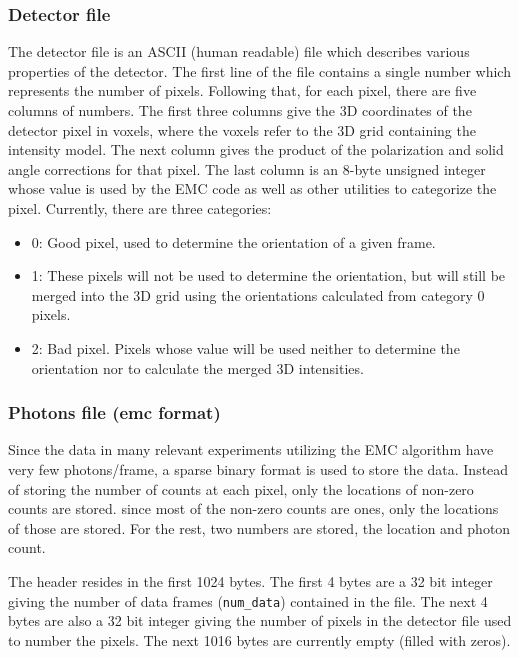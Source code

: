 \documentclass[]{iucr}              %
\begin{document}
\subsubsection{Detector file}\label{subsubsec:detector}
The detector file is an ASCII (human readable) file which describes various properties of the detector. The first line of the file contains a single number which represents the number of pixels. Following that, for each pixel, there are five columns of numbers. The first three columns give the 3D coordinates of the detector pixel in voxels, where the voxels refer to the 3D grid containing the intensity model. The next column gives the product of the polarization and solid angle corrections for that pixel. The last column is an 8-byte unsigned integer whose value is used by the EMC code as well as other utilities to categorize the pixel. Currently, there are three categories:
\begin{itemize}
\item 0: Good pixel, used to determine the orientation of a given frame.
\item 1: These pixels will not be used to determine the orientation, but will still be merged into the 3D grid using the orientations calculated from category 0 pixels.
\item 2: Bad pixel. Pixels whose value will be used neither to determine the orientation nor to calculate the merged 3D intensities.
\end{itemize}

\subsubsection{Photons file (emc format)}\label{subsubsec:emcformat}
Since the data in many relevant experiments utilizing the EMC algorithm have very few photons/frame, a sparse binary format is used to store the data. Instead of storing the number of counts at each pixel, only the locations of non-zero counts are stored. since most of the non-zero counts are ones, only the locations of those are stored. For the rest, two numbers are stored, the location and photon count. 

The header resides in the first 1024 bytes. The first 4 bytes are a 32 bit integer giving the number of data frames (\texttt{num\_data}) contained in the file. The next 4 bytes are also a 32 bit integer giving the number of pixels in the detector file used to number the pixels. The next 1016 bytes are currently empty (filled with zeros).
\end{document}

